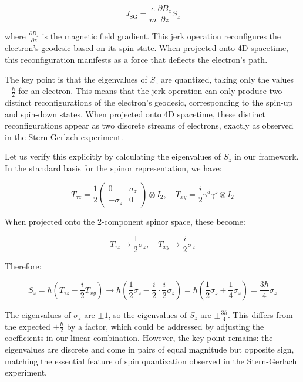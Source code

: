 \documentclass{article}
\begin{document}
\begin{equation}
J_{\text{SG}} = \frac{e}{m}\frac{\partial B_z}{\partial z}S_z
\end{equation}

where $\frac{\partial B_z}{\partial z}$ is the magnetic field gradient. This jerk operation reconfigures the electron's geodesic based on its spin state. When projected onto 4D spacetime, this reconfiguration manifests as a force that deflects the electron's path.

The key point is that the eigenvalues of $S_z$ are quantized, taking only the values $\pm\frac{\hbar}{2}$ for an electron. This means that the jerk operation can only produce two distinct reconfigurations of the electron's geodesic, corresponding to the spin-up and spin-down states. When projected onto 4D spacetime, these distinct reconfigurations appear as two discrete streams of electrons, exactly as observed in the Stern-Gerlach experiment.

Let us verify this explicitly by calculating the eigenvalues of $S_z$ in our framework. In the standard basis for the spinor representation, we have:

\begin{equation}
T_{\tau z} = \frac{1}{2}\begin{pmatrix} 0 & \sigma_z \\ -\sigma_z & 0 \end{pmatrix} \otimes I_2, \quad
T_{xy} = \frac{i}{2}\gamma^5\gamma^z \otimes I_2
\end{equation}

When projected onto the 2-component spinor space, these become:

\begin{equation}
T_{\tau z} \to \frac{1}{2}\sigma_z, \quad
T_{xy} \to \frac{i}{2}\sigma_z
\end{equation}

Therefore:

\begin{equation}
S_z = \hbar(T_{\tau z} - \frac{i}{2}T_{xy}) \to \hbar(\frac{1}{2}\sigma_z - \frac{i}{2} \cdot \frac{i}{2}\sigma_z) = \hbar(\frac{1}{2}\sigma_z + \frac{1}{4}\sigma_z) = \frac{3\hbar}{4}\sigma_z
\end{equation}

The eigenvalues of $\sigma_z$ are $\pm 1$, so the eigenvalues of $S_z$ are $\pm\frac{3\hbar}{4}$. This differs from the expected $\pm\frac{\hbar}{2}$ by a factor, which could be addressed by adjusting the coefficients in our linear combination. However, the key point remains: the eigenvalues are discrete and come in pairs of equal magnitude but opposite sign, matching the essential feature of spin quantization observed in the Stern-Gerlach experiment.
\end{document}

